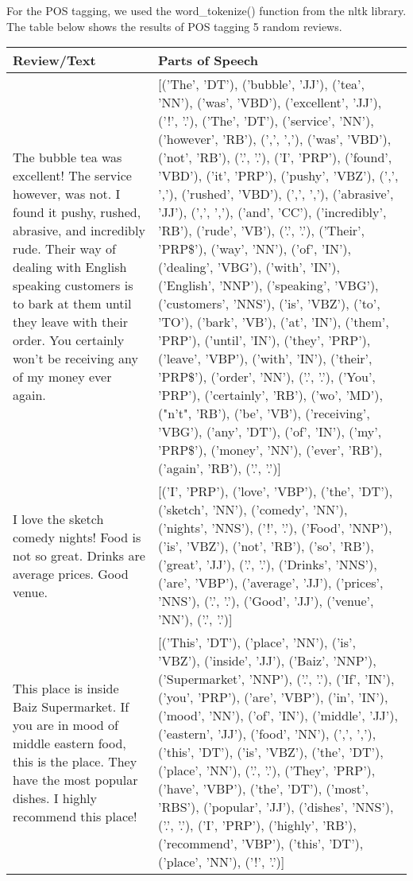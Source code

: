 For the POS tagging, we used the word\_tokenize() function from the nltk library. The table below shows the results of POS tagging 5 random reviews.

\setlength{\tabcolsep}{18pt}
\renewcommand{\arraystretch}{1.75}
    \begin{longtable}{| p{3cm} | p{3cm} |} 
    	
        \hline 
         \textbf{Review/Text} & \textbf{Parts of Speech} \\ [0.5ex] 
         \hline
         The bubble tea was excellent! The service however, was not. I found it pushy, rushed, abrasive, and incredibly rude. Their way of dealing with English speaking customers is to bark at them until they leave with their order. You certainly won't be receiving any of my money ever again. & [('The', 'DT'), ('bubble', 'JJ'), ('tea', 'NN'), ('was', 'VBD'), ('excellent', 'JJ'), ('!', '.'), ('The', 'DT'), ('service', 'NN'), ('however', 'RB'), (',', ','), ('was', 'VBD'), ('not', 'RB'), ('.', '.'), ('I', 'PRP'), ('found', 'VBD'), ('it', 'PRP'), ('pushy', 'VBZ'), (',', ','), ('rushed', 'VBD'), (',', ','), ('abrasive', 'JJ'), (',', ','), ('and', 'CC'), ('incredibly', 'RB'), ('rude', 'VB'), ('.', '.'), ('Their', 'PRP\$'), ('way', 'NN'), ('of', 'IN'), ('dealing', 'VBG'), ('with', 'IN'), ('English', 'NNP'), ('speaking', 'VBG'), ('customers', 'NNS'), ('is', 'VBZ'), ('to', 'TO'), ('bark', 'VB'), ('at', 'IN'), ('them', 'PRP'), ('until', 'IN'), ('they', 'PRP'), ('leave', 'VBP'), ('with', 'IN'), ('their', 'PRP\$'), ('order', 'NN'), ('.', '.'), ('You', 'PRP'), ('certainly', 'RB'), ('wo', 'MD'), ("n't", 'RB'), ('be', 'VB'), ('receiving', 'VBG'), ('any', 'DT'), ('of', 'IN'), ('my', 'PRP\$'), ('money', 'NN'), ('ever', 'RB'), ('again', 'RB'), ('.', '.')] \\ 
         \hline
         I love the sketch comedy nights! Food is not so great. Drinks are average prices. Good venue. & [('I', 'PRP'), ('love', 'VBP'), ('the', 'DT'), ('sketch', 'NN'), ('comedy', 'NN'), ('nights', 'NNS'), ('!', '.'), ('Food', 'NNP'), ('is', 'VBZ'), ('not', 'RB'), ('so', 'RB'), ('great', 'JJ'), ('.', '.'), ('Drinks', 'NNS'), ('are', 'VBP'), ('average', 'JJ'), ('prices', 'NNS'), ('.', '.'), ('Good', 'JJ'), ('venue', 'NN'), ('.', '.')] \\
         \hline
         This place is inside Baiz Supermarket. If you are in mood of middle eastern food, this is the place. They have the most popular dishes. I highly recommend this place! & [('This', 'DT'), ('place', 'NN'), ('is', 'VBZ'), ('inside', 'JJ'), ('Baiz', 'NNP'), ('Supermarket', 'NNP'), ('.', '.'), ('If', 'IN'), ('you', 'PRP'), ('are', 'VBP'), ('in', 'IN'), ('mood', 'NN'), ('of', 'IN'), ('middle', 'JJ'), ('eastern', 'JJ'), ('food', 'NN'), (',', ','), ('this', 'DT'), ('is', 'VBZ'), ('the', 'DT'), ('place', 'NN'), ('.', '.'), ('They', 'PRP'), ('have', 'VBP'), ('the', 'DT'), ('most', 'RBS'), ('popular', 'JJ'), ('dishes', 'NNS'), ('.', '.'), ('I', 'PRP'), ('highly', 'RB'), ('recommend', 'VBP'), ('this', 'DT'), ('place', 'NN'), ('!', '.')] \\

\end{longtable}
